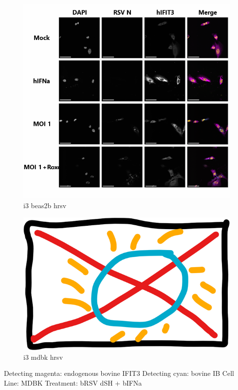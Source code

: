 \begin{figure}
    \centering
    \includegraphics[width=1\linewidth]{09. Chapter 4/Figs/04. IFIT3/03. beas2b hrsv.png}
    \caption[i3 beas2b hrsv]{i3 beas2b hrsv}
    \label{fig:i3 beas2b hrsv}
\end{figure}


\begin{figure}
    \centering
    \includegraphics[width=0.5\linewidth]{06. Chapter 1//Figs/00. placeholder.png}
    \caption[i3 mdbk hrsv]{i3 mdbk hrsv}
    \label{fig:i3 mdbk hrsv}
\end{figure}

Detecting magenta: endogenous bovine IFIT3 \newline
Detecting cyan: bovine IB \newline
Cell Line: MDBK \newline
Treatment: bRSV dSH + bIFNa \newline

